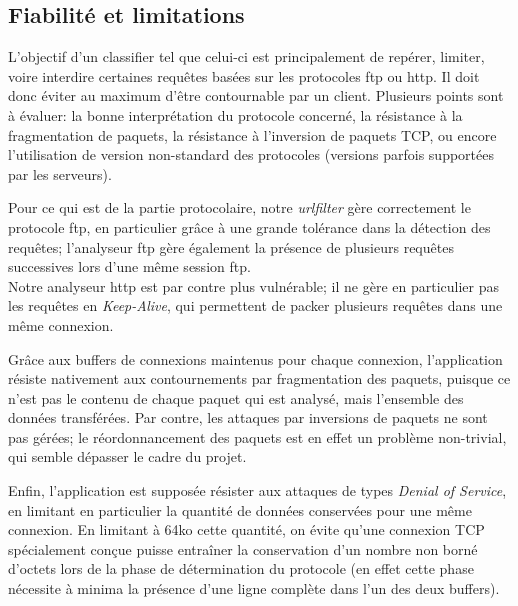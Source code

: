 \subsection{Fiabilité et limitations}
  L'objectif d'un classifier tel que celui-ci est principalement de repérer, limiter, voire interdire certaines requêtes basées sur les protocoles ftp ou http.
  Il doit donc éviter au maximum d'être contournable par un client. Plusieurs points sont à évaluer: la bonne interprétation du protocole concerné, la résistance à la
  fragmentation de paquets, la résistance à l'inversion de paquets TCP, ou encore l'utilisation de version non-standard des protocoles (versions parfois supportées par
  les serveurs).
  
  Pour ce qui est de la partie protocolaire, notre \emph{urlfilter} gère correctement le protocole ftp, en particulier grâce à une grande tolérance dans la détection
  des requêtes; l'analyseur ftp gère également la présence de plusieurs requêtes successives lors d'une même session ftp.\\
  Notre analyseur http est par contre plus vulnérable; il ne gère en particulier pas les requêtes en \emph{Keep-Alive}, qui permettent de packer plusieurs requêtes dans une
  même connexion.
  
  Grâce aux buffers de connexions maintenus pour chaque connexion, l'application résiste nativement aux contournements par fragmentation des paquets, puisque ce n'est pas le
  contenu de chaque paquet qui est analysé, mais l'ensemble des données transférées. Par contre, les attaques par inversions de paquets ne sont pas gérées; le réordonnancement
  des paquets est en effet un problème non-trivial, qui semble dépasser le cadre du projet.
  
  Enfin, l'application est supposée résister aux attaques de types \emph{Denial of Service}, en limitant en particulier la quantité de données conservées pour une même connexion.
  En limitant à 64ko cette quantité, on évite qu'une connexion TCP spécialement conçue puisse entraîner la conservation d'un nombre non borné d'octets lors de la phase de
  détermination du protocole (en effet cette phase nécessite à minima la présence d'une ligne complète dans l'un des deux buffers).
